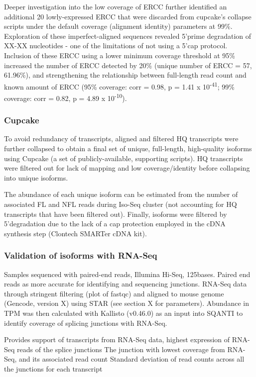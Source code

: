 Deeper investigation into the low coverage of ERCC further identified an additional 20 lowly-expressed ERCC that were discarded from cupcake's collapse scripts under the default coverage (alignment identity) parameters at 99\%. Exploration of these imperfect-aligned sequences revealed 5'prime degradation of XX-XX nucleotides - one of the limitations of not using a 5'cap protocol. Inclusion of these ERCC using a lower minimum coverage threshold at 95\% increased the number of ERCC detected by 20\% (unique number of ERCC = 57, 61.96\%), and strengthening the relationship between full-length read count and known amount of ERCC (95\% coverage: corr = 0.98, p = 1.41 x 10\textsuperscript{-41}; 99\% coverage: corr = 0.82, p = 4.89 x 10\textsuperscript{-10}).   


\subsubsection{Cupcake}
To avoid redundancy of transcripts, aligned and filtered HQ transcripts were further collapsed to obtain a final set of unique, full-length, high-quality isoforms using Cupcake (a set of publicly-available, supporting scripts). HQ transcripts were filtered out for lack of mapping and low coverage/identity before collapsing into unique isoforms.  

The abundance of each unique isoform can be estimated from the number of associated FL and NFL reads during Iso-Seq cluster (not accounting for HQ transcripts that have been filtered out).  Finally, isoforms were filtered by 5’degradation due to the lack of a cap protection employed in the cDNA synthesis step (Clontech SMARTer cDNA kit). 

\subsubsection{Validation of isoforms with RNA-Seq} 
\label{section:ch2_rnaseq_support_bioinformatics}
Samples sequenced with paired-end reads, Illumina Hi-Seq, 125bases. Paired end reads as more accurate for identifying and sequencing junctions. RNA-Seq data through stringent filtering (plot of fastqc) and aligned to mouse genome (Gencode, version X) using STAR (see section X for parameters). Abundance in TPM was then calculated with Kallisto (v0.46.0) \cite{Bray2016} as an input into SQANTI to identify coverage of splicing junctions with RNA-Seq.  

Provides support of transcripts from RNA-Seq data, highest expression of RNA-Seq reads of the splice junctions 
The junction with lowest coverage from RNA-Seq, and its associated read count 	
Standard deviation of read counts across all the junctions for each transcript 



